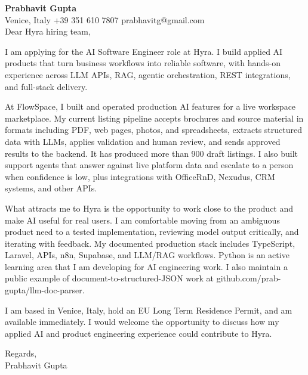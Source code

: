 \documentclass[a4paper,10.5pt]{article}
\begin{document}
\textbf{Prabhavit Gupta}\\
Venice, Italy \textbar{} +39 351 610 7807 \textbar{} prabhavitg@gmail.com\\[10pt]
Dear Hyra hiring team,

I am applying for the AI Software Engineer role at Hyra. I build applied AI products that turn business workflows into reliable software, with hands-on experience across LLM APIs, RAG, agentic orchestration, REST integrations, and full-stack delivery.

At FlowSpace, I built and operated production AI features for a live workspace marketplace. My current listing pipeline accepts brochures and source material in formats including PDF, web pages, photos, and spreadsheets, extracts structured data with LLMs, applies validation and human review, and sends approved results to the backend. It has produced more than 900 draft listings. I also built support agents that answer against live platform data and escalate to a person when confidence is low, plus integrations with OfficeRnD, Nexudus, CRM systems, and other APIs.

What attracts me to Hyra is the opportunity to work close to the product and make AI useful for real users. I am comfortable moving from an ambiguous product need to a tested implementation, reviewing model output critically, and iterating with feedback. My documented production stack includes TypeScript, Laravel, APIs, n8n, Supabase, and LLM/RAG workflows. Python is an active learning area that I am developing for AI engineering work. I also maintain a public example of document-to-structured-JSON work at github.com/prab-gupta/llm-doc-parser.

I am based in Venice, Italy, hold an EU Long Term Residence Permit, and am available immediately. I would welcome the opportunity to discuss how my applied AI and product engineering experience could contribute to Hyra.

Regards,\\
Prabhavit Gupta
\end{document}
